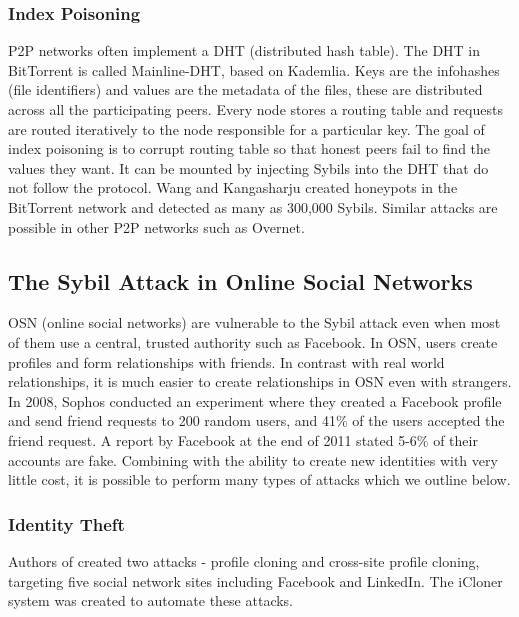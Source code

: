 
\subsubsection{Index Poisoning}
P2P networks often implement a DHT (distributed hash table). The DHT in
BitTorrent is called Mainline-DHT, based on
Kademlia\cite{maymounkov2002kademlia}. Keys are the infohashes (file
identifiers) and values are the metadata of the files, these are distributed
across all the participating peers. Every node stores a routing table and
requests are routed iteratively to the node responsible for a particular
key\cite{bep5}. The goal of index poisoning is to corrupt routing table so that
honest peers fail to find the values they want. It can be mounted by injecting
Sybils into the DHT that do not follow the protocol. Wang and Kangasharju
created honeypots in the BitTorrent network and detected as many as 300,000
Sybils\cite{wang2012real}. Similar attacks are possible in other P2P networks
such as Overnet\cite{liang2006index}.


% 

\subsection{The Sybil Attack in Online Social Networks}
OSN (online social networks) are vulnerable to the Sybil attack even when most
of them use a central, trusted authority such as Facebook. In OSN, users create
profiles and form relationships with friends. In contrast with real world
relationships, it is much easier to create relationships in OSN even with
strangers. In 2008, Sophos conducted an experiment where they created a Facebook
profile and send friend requests to 200 random users, and 41\% of the users
accepted the friend request\cite{sophos}. A report by Facebook at the end of
2011 stated 5-6\% of their accounts are fake\cite{facebookfake}. Combining with
the ability to create new identities with very little cost, it is possible to
perform many types of attacks which we outline below.

\subsubsection{Identity Theft}
Authors of \cite{bilge2009all} created two attacks - profile cloning and
cross-site profile cloning, targeting five social network sites including
Facebook and LinkedIn. The iCloner system was created to automate these
attacks.

